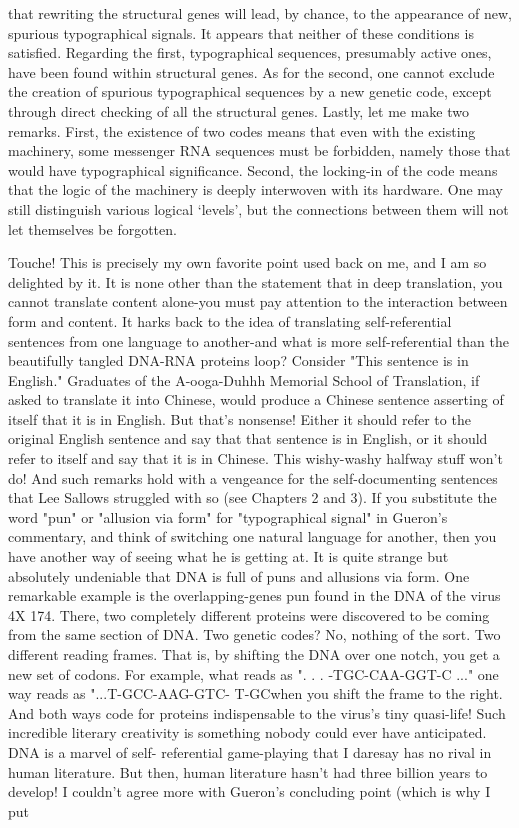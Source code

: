    that rewriting the structural genes will lead, by chance, to the appearance of
   new, spurious typographical signals.
            It appears that neither of these conditions is satisfied. Regarding the first,
   typographical sequences, presumably active ones, have been found within
   structural genes. As for the second, one cannot exclude the creation of spurious
   typographical sequences by a new genetic code, except through direct checking
   of all the structural genes.
            Lastly, let me make two remarks. First, the existence of two codes
   means that even with the existing machinery, some messenger RNA sequences
   must be forbidden, namely those that would have typographical significance.
   Second, the locking-in of the code means that the logic of the machinery is
   deeply interwoven with its hardware. One may still distinguish various logical
   `levels', but the connections between them will not let themselves be forgotten.

        Touche! This is precisely my own favorite point used back on me, and I am so
delighted by it. It is none other than the statement that in deep translation, you cannot
translate content alone-you must pay attention to the interaction between form and
content. It harks back to the idea of translating self-referential sentences from one
language to another-and what is more self-referential than the beautifully tangled
DNA-RNA proteins loop?
        Consider "This sentence is in English." Graduates of the A-ooga-Duhhh
Memorial School of Translation, if asked to translate it into Chinese, would produce a
Chinese sentence asserting of itself that it is in English. But that's nonsense! Either it
should refer to the original English sentence and say that that sentence is in English,
or it should refer to itself and say that it is in Chinese. This wishy-washy halfway stuff
won't do! And such remarks hold with a vengeance for the self-documenting
sentences that Lee Sallows struggled with so (see Chapters 2 and 3).
        If you substitute the word "pun" or "allusion via form" for "typographical
signal" in Gueron's commentary, and think of switching one natural language for
another, then you have another way of seeing what he is getting at. It is quite strange
but absolutely undeniable that DNA is full of puns and allusions via form. One
remarkable example is the overlapping-genes pun found in the DNA of the virus 4X
174. There, two completely different proteins were discovered to be coming from the
same section of DNA. Two genetic codes? No, nothing of the sort. Two different
reading frames. That is, by shifting the DNA over one notch, you get a new set of
codons. For example, what reads as ". . . -TGC-CAA-GGT-C ..." one way reads as
"...T-GCC-AAG-GTC- T-GCwhen you shift the frame to the right. And both ways
code for proteins indispensable to the virus's tiny quasi-life! Such incredible literary
creativity is something nobody could ever have anticipated. DNA is a marvel of self-
referential game-playing that I daresay has no rival in human literature. But then,
human literature hasn't had three billion years to develop!
        I couldn't agree more with Gueron's concluding point (which is why I put




